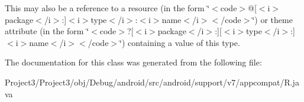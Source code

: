 This may also be a reference to a resource (in the form \char`\"{}$<$code$>$@\mbox{[}$<$i$>$package$<$/i$>$\+:\mbox{]}$<$i$>$type$<$/i$>$\+:$<$i$>$name$<$/i$>$$<$/code$>$\char`\"{}) or theme attribute (in the form \char`\"{}$<$code$>$?\mbox{[}$<$i$>$package$<$/i$>$\+:\mbox{]}\mbox{[}$<$i$>$type$<$/i$>$\+:\mbox{]}$<$i$>$name$<$/i$>$$<$/code$>$\char`\"{}) containing a value of this type. 

The documentation for this class was generated from the following file\+:\begin{DoxyCompactItemize}
\item 
Project3/\+Project3/obj/\+Debug/android/src/android/support/v7/appcompat/R.\+java\end{DoxyCompactItemize}

